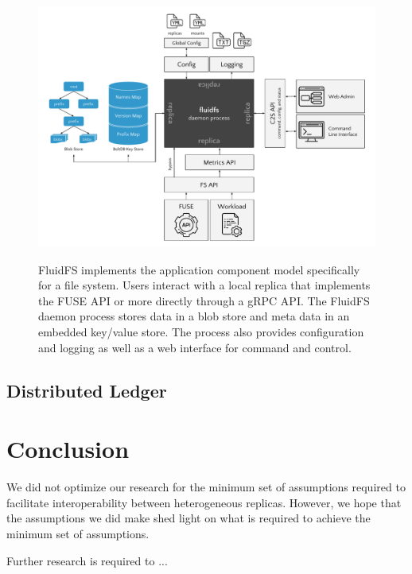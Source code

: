 \begin{landscape}
\begin{figure}
    \begin{center}
        \includegraphics[width=7.2in]{figures/ch05_fluidfs_replica.pdf}
    \end{center}
    \renewcommand{\baselinestretch}{1}
    \small\normalsize

    \begin{quote}
        \caption[FluidFS Architecture]{FluidFS implements the application component model specifically for a file system. Users interact with a local replica that implements the FUSE API or more directly through a gRPC API. The FluidFS daemon process stores data in a blob store and meta data in an embedded key/value store. The process also provides configuration and logging as well as a web interface for command and control.}
        \label{fig:ch05_fluidfs_replica}
    \end{quote}
\end{figure}
\renewcommand{\baselinestretch}{2}
\small\normalsize
\end{landscape}

\subsection{Distributed Ledger}
\label{ch05_distributed_ledger}

\section{Conclusion}
\label{ch05_conclusion}

We did not optimize our research for the minimum set of assumptions required to facilitate interoperability between heterogeneous replicas.
However, we hope that the assumptions we did make shed light on what is required to achieve the minimum set of assumptions.

Further research is required to ...
